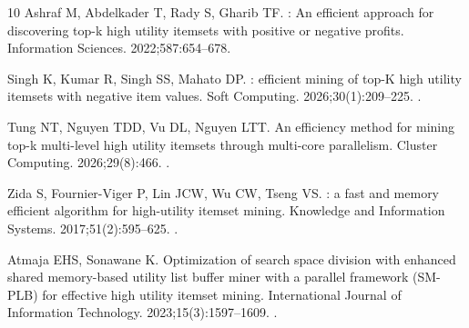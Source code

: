 \documentclass[pdflatex,sn-vancouver-num]{sn-jnl}
\theoremstyle{thmstyleone}%
\theoremstyle{thmstyletwo}%
\theoremstyle{thmstylethree}%
\begin{document}
\begin{thebibliography}{10}
Ashraf M, Abdelkader T, Rady S, Gharib TF.
: An efficient approach for discovering top-k high utility
  itemsets with positive or negative profits.
\newblock Information Sciences. 2022;587:654--678.

Singh K, Kumar R, Singh SS, Mahato DP.
: efficient mining of top-{K} high utility itemsets with
  negative item values.
\newblock Soft Computing. 2026;30(1):209--225.
\newblock {}.
 
Tung NT, Nguyen TDD, Vu DL, Nguyen LTT.
\newblock An efficiency method for mining top-k multi-level high utility
  itemsets through multi-core parallelism.
\newblock Cluster Computing. 2026;29(8):466.
\newblock {}.
 
Zida S, Fournier-Viger P, Lin JCW, Wu CW, Tseng VS.
: a fast and memory efficient algorithm for high-utility
  itemset mining.
\newblock Knowledge and Information Systems. 2017;51(2):595--625.
\newblock {}.
 
Atmaja EHS, Sonawane K.
\newblock Optimization of search space division with enhanced shared
  memory-based utility list buffer miner with a parallel framework
  ({SM-PLB}) for effective high utility itemset mining.
\newblock International Journal of Information Technology. 2023;15(3):1597--1609.
\newblock {}.

\end{thebibliography}
\end{document}
